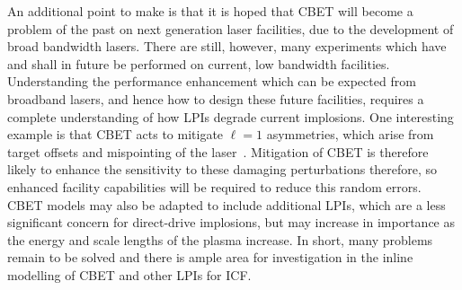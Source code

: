 An additional point to make is that it is hoped that \ac{CBET} will become a problem of the past on next generation laser facilities, due to the development of broad bandwidth lasers.
There are still, however, many experiments which have and shall in future be performed on current, low bandwidth facilities.
Understanding the performance enhancement which can be expected from broadband lasers, and hence how to design these future facilities, requires a complete understanding of how \ac{LPIs} degrade current implosions.
One interesting example is that \ac{CBET} acts to mitigate $\ell=1$ asymmetries, which arise from target offsets and mispointing of the laser~\cite{anderson_effect_2020}.
Mitigation of \ac{CBET} is therefore likely to enhance the sensitivity to these damaging perturbations therefore, so enhanced facility capabilities will be required to reduce this random errors.
\ac{CBET} models may also be adapted to include additional \ac{LPIs}, which are a less significant concern for direct-drive implosions, but may increase in importance as the energy and scale lengths of the plasma increase.
In short, many problems remain to be solved and there is ample area for investigation in the inline modelling of \ac{CBET} and other \ac{LPIs} for \ac{ICF}.
